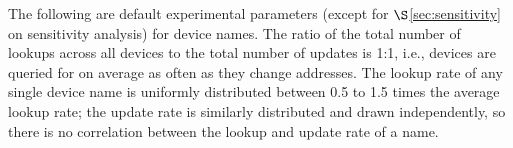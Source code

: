 
The following are default experimental parameters (except for $\S$\ref{sec:sensitivity} on sensitivity analysis) for device names. The ratio of the total number of lookups across all devices to the total number of updates is 1:1, i.e., devices are queried for on average as often as they change addresses. The lookup rate of any single device name is uniformly distributed between 0.5 to 1.5 times the average lookup rate; the update rate is similarly distributed and drawn independently, so there is no correlation between the lookup and update rate of a name.






